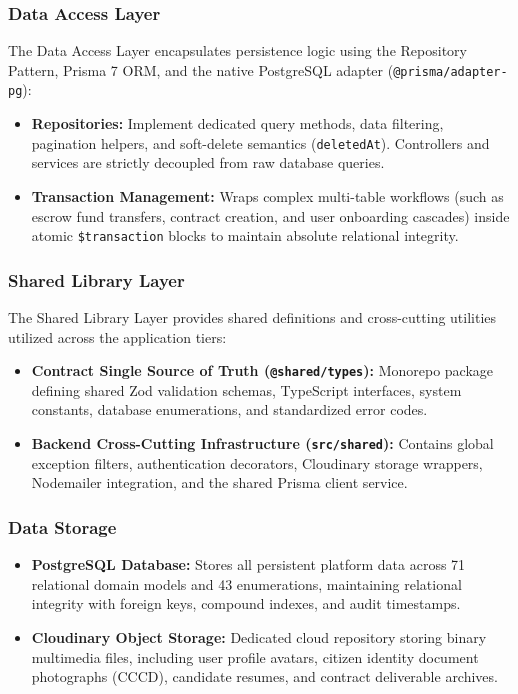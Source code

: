 \subsubsection*{Data Access Layer}
The Data Access Layer encapsulates persistence logic using the Repository Pattern, Prisma 7 ORM, and the native PostgreSQL adapter (\texttt{@prisma/\allowbreak{}adapter-\allowbreak{}pg}):
\begin{itemize}[leftmargin=*]
    \item \textbf{Repositories:} Implement dedicated query methods, data filtering, pagination helpers, and soft-delete semantics (\texttt{deletedAt}). Controllers and services are strictly decoupled from raw database queries.
    \item \textbf{Transaction Management:} Wraps complex multi-table workflows (such as escrow fund transfers, contract creation, and user onboarding cascades) inside atomic \texttt{\$transaction} blocks to maintain absolute relational integrity.
\end{itemize}

\subsubsection*{Shared Library Layer}
The Shared Library Layer provides shared definitions and cross-cutting utilities utilized across the application tiers:
\begin{itemize}[leftmargin=*]
    \item \textbf{Contract Single Source of Truth (\texttt{@shared/types}):} Monorepo package defining shared Zod validation schemas, TypeScript interfaces, system constants, database enumerations, and standardized error codes.
    \item \textbf{Backend Cross-Cutting Infrastructure (\texttt{src/shared}):} Contains global exception filters, authentication decorators, Cloudinary storage wrappers, Nodemailer integration, and the shared Prisma client service.
\end{itemize}

\subsubsection*{Data Storage}
\begin{itemize}[leftmargin=*]
    \item \textbf{PostgreSQL Database:} Stores all persistent platform data across 71 relational domain models and 43 enumerations, maintaining relational integrity with foreign keys, compound indexes, and audit timestamps.
    \item \textbf{Cloudinary Object Storage:} Dedicated cloud repository storing binary multimedia files, including user profile avatars, citizen identity document photographs (CCCD), candidate resumes, and contract deliverable archives.
\end{itemize}


